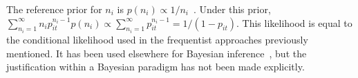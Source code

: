 \documentclass[thesis.tex]{subfiles}
\begin{document}
The reference prior for $n_i$ is $p(n_i) \propto 1/n_i$~\autocite{heBayesiana}.
Under this prior,
$\sum_{n_i=1}^\infty n_i p_{it}^{n_i- 1} p(n_i) \propto \sum_{n_i=1}^\infty p_{it}^{n_i-1} = 1/(1-p_{it})$.
This likelihood is equal to the conditional likelihood used in the frequentist approaches previously mentioned.
It has been used elsewhere for Bayesian inference~\autocite{zhouUnified}, but the justification within a Bayesian paradigm has not been made explicitly.
\end{document}
